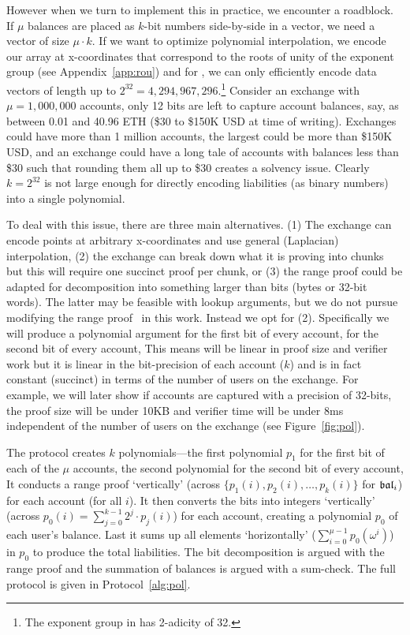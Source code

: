 However when we turn to implement this in practice, we encounter a roadblock. If $\mu$ balances are placed as $k$-bit numbers side-by-side in a vector, we need a vector of size $\mu \cdot k$. If we want to optimize polynomial interpolation, we encode our array at x-coordinates that correspond to the roots of unity of the exponent group (see Appendix~\ref{app:rou}) and for \bls, we can only efficiently encode data vectors of length up to \(2^{32}=4,294,967,296\).\footnote{The exponent group in \bls has 2-adicity of 32.} Consider an exchange with $\mu=1,000,000$ accounts, only 12 bits are left to capture account balances, say, as between 0.01 and 40.96 ETH (\$30 to \$150K USD at time of writing). Exchanges could have more than 1 million accounts, the largest could be more than \$150K USD, and an exchange could have a long tale of accounts with balances less than \$30 such that rounding them all up to \$30 creates a solvency issue. Clearly \(k=2^{32}\) is not large enough for directly encoding liabilities (as binary numbers) into a single polynomial.

To deal with this issue, there are three main alternatives. (1) The exchange can encode points at arbitrary x-coordinates and use general (Laplacian) interpolation, (2) the exchange can break down what it is proving into chunks but this will require one succinct proof per chunk, or (3) the range proof could be adapted for decomposition into something larger than bits (\eg bytes or 32-bit words). The latter may be feasible with lookup arguments, but we do not pursue modifying the range proof~\cite{rangeproof} in this work. Instead we opt for (2). Specifically we will produce a polynomial argument for the first bit of every account, for the second bit of every account, \etc This means \pol will be linear in proof size and verifier work but it is linear in the bit-precision of each account ($k$) and is in fact constant (succinct) in terms of the number of users on the exchange. For example, we will later show if accounts are captured with a precision of 32-bits, the proof size will be under 10KB and verifier time will be under 8ms independent of the number of users on the exchange (see Figure~\ref{fig:pol}).  

The protocol creates $k$ polynomials---the first polynomial $p_1$ for the first bit of each of the $\mu$ accounts, the second polynomial for the second bit of every account, \etc It conducts a range proof `vertically' (across $\{p_1(i), p_2(i), \ldots, p_k(i)\}$ for $\mathfrak{bal}_i$) for each account (for all $i$). It then converts the bits into integers `vertically' (across $p_0(i)=\sum_{j=0}^{k-1} 2^j \cdot p_j(i)$)  for each account, creating a polynomial $p_0$ of each user's balance. Last it sums up all elements `horizontally' ($\sum_{i=0}^{\mu-1} p_0(\omega^i)$) in $p_0$ to produce the total liabilities. The bit decomposition is argued with the range proof and the summation of balances is argued with a sum-check. The full protocol is given in Protocol~\ref{alg:pol}. 

